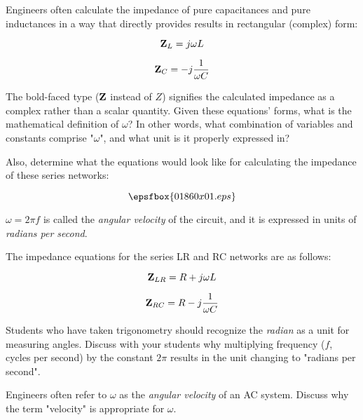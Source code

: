 

Engineers often calculate the impedance of pure capacitances and pure inductances in a way that directly provides results in rectangular (complex) form:

$${\bf Z}_L = j \omega L$$

$${\bf Z}_C = -j {1 \over {\omega C}}$$

The bold-faced type (${\bf Z}$ instead of $Z$) signifies the calculated impedance as a complex rather than a scalar quantity.  Given these equations' forms, what is the mathematical definition of $\omega$?  In other words, what combination of variables and constants comprise "$\omega$", and what unit is it properly expressed in?

Also, determine what the equations would look like for calculating the impedance of these series networks:

$$\epsfbox{01860x01.eps}$$







$\omega = 2 \pi f$ is called the {\it angular velocity} of the circuit, and it is expressed in units of {\it radians per second}.

\vskip 10pt

The impedance equations for the series LR and RC networks are as follows:

$${\bf Z}_{LR} = R + j \omega L$$

$${\bf Z}_{RC} = R - j {1 \over {\omega C}}$$







Students who have taken trigonometry should recognize the {\it radian} as a unit for measuring angles.  Discuss with your students why multiplying frequency ($f$, cycles per second) by the constant $2 \pi$ results in the unit changing to "radians per second".

Engineers often refer to $\omega$ as the {\it angular velocity} of an AC system.  Discuss why the term "velocity" is appropriate for $\omega$.




